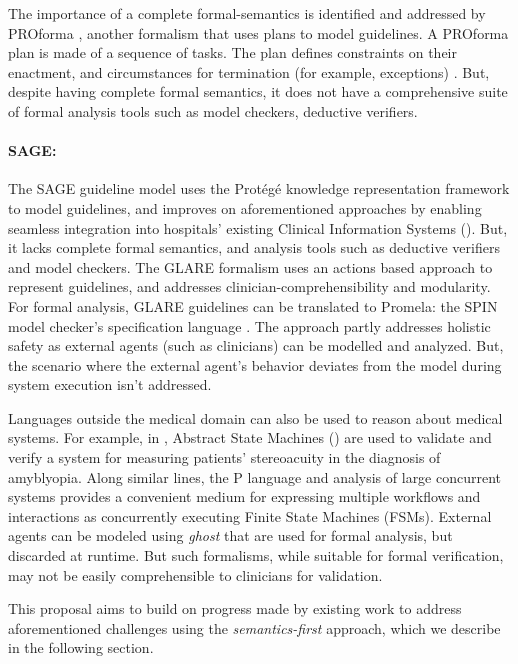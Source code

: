 The importance of a complete formal-semantics is identified and addressed
by PROforma \cite{SuttonAMIA03}, another formalism that uses plans to
model guidelines. A PROforma plan is made of a sequence of tasks.
The plan defines constraints on their enactment, and circumstances
for termination (for example, exceptions) \cite{SuttonAMIA03}. But, despite
having complete formal semantics, it does not have a comprehensive suite of
formal analysis tools such as model checkers, deductive verifiers.

\paragraph{SAGE:}
The SAGE guideline model \cite{TuSAGE04} uses the Prot\'eg\'e knowledge
representation framework \cite{NoyAMIA03} to model guidelines,
and improves on aforementioned approaches by
enabling seamless integration into hospitals' existing Clinical Information Systems
(\CISs). But, it lacks complete formal semantics, and analysis tools
such as deductive verifiers and model checkers.
The GLARE formalism \cite{TerenzianiBook04} uses an actions based approach
to represent guidelines, and addresses clinician-comprehensibility and
modularity. For formal analysis, GLARE guidelines can be translated to
Promela: the SPIN model checker's specification language \cite{GiordanoAMIA06}.
The approach partly addresses holistic safety as
external agents (such as clinicians) can be modelled and analyzed.
But, the scenario where the external agent's behavior
deviates from the model during system execution isn't addressed.


Languages outside the medical domain can also be used to reason about
medical systems. For example, in \cite{ArcainiMEMCODE15}, Abstract State
Machines (\ASMs) are used to validate and verify a system for measuring
patients' stereoacuity in the diagnosis of amyblyopia.
Along similar lines, the P language \cite{DesaiPLDI13}
and analysis of large concurrent systems provides a convenient medium
for expressing multiple workflows and interactions as concurrently
executing Finite State Machines (FSMs). External agents can be modeled
using \emph{ghost} that are used for formal analysis, but discarded at runtime.
But such formalisms, while suitable for formal verification, may
not be easily comprehensible to clinicians for validation.

This proposal aims to build on progress made by existing work to
address aforementioned challenges using the \emph{semantics-first} approach,
which we describe in the following section.

